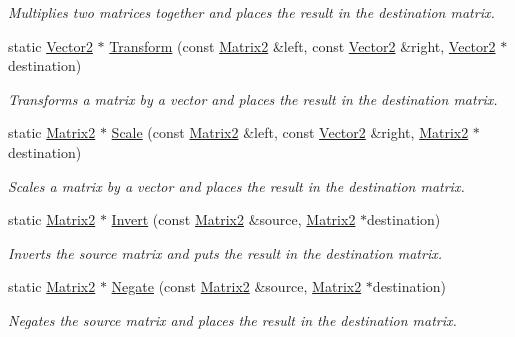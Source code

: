 \begin{DoxyCompactItemize}
\begin{DoxyCompactList}\small\item\em Multiplies two matrices together and places the result in the destination matrix. \end{DoxyCompactList}\item 
static \hyperlink{class_flounder_1_1_vector2}{Vector2} $\ast$ \hyperlink{class_flounder_1_1_matrix2_a729372a06729c04b3e95d3452130cfeb}{Transform} (const \hyperlink{class_flounder_1_1_matrix2}{Matrix2} \&left, const \hyperlink{class_flounder_1_1_vector2}{Vector2} \&right, \hyperlink{class_flounder_1_1_vector2}{Vector2} $\ast$destination)
\begin{DoxyCompactList}\small\item\em Transforms a matrix by a vector and places the result in the destination matrix. \end{DoxyCompactList}\item 
static \hyperlink{class_flounder_1_1_matrix2}{Matrix2} $\ast$ \hyperlink{class_flounder_1_1_matrix2_abea3011359ab89c1bec339d046a8f60b}{Scale} (const \hyperlink{class_flounder_1_1_matrix2}{Matrix2} \&left, const \hyperlink{class_flounder_1_1_vector2}{Vector2} \&right, \hyperlink{class_flounder_1_1_matrix2}{Matrix2} $\ast$destination)
\begin{DoxyCompactList}\small\item\em Scales a matrix by a vector and places the result in the destination matrix. \end{DoxyCompactList}\item 
static \hyperlink{class_flounder_1_1_matrix2}{Matrix2} $\ast$ \hyperlink{class_flounder_1_1_matrix2_a23c8ed84d77811f8d1e2875a6aa55175}{Invert} (const \hyperlink{class_flounder_1_1_matrix2}{Matrix2} \&source, \hyperlink{class_flounder_1_1_matrix2}{Matrix2} $\ast$destination)
\begin{DoxyCompactList}\small\item\em Inverts the source matrix and puts the result in the destination matrix. \end{DoxyCompactList}\item 
static \hyperlink{class_flounder_1_1_matrix2}{Matrix2} $\ast$ \hyperlink{class_flounder_1_1_matrix2_a6b497f0562f3df1b37fd780566df33a7}{Negate} (const \hyperlink{class_flounder_1_1_matrix2}{Matrix2} \&source, \hyperlink{class_flounder_1_1_matrix2}{Matrix2} $\ast$destination)
\begin{DoxyCompactList}\small\item\em Negates the source matrix and places the result in the destination matrix. \end{DoxyCompactList}\item 

\end{DoxyCompactItemize}
